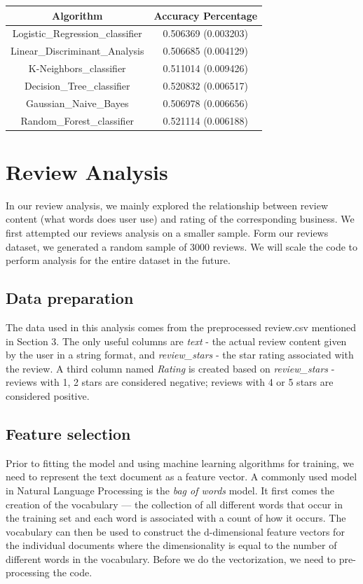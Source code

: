 \documentclass{article}
\begin{document}
\begin{table}[!ht]
\begin{center}
\begin{tabular}{ |c|c| } 
 \hline
Algorithm & Accuracy Percentage \\ 
  \hline
Logistic\_Regression\_classifier & 0.506369 (0.003203) \\ 
  \hline
Linear\_Discriminant\_Analysis & 0.506685 (0.004129) \\
  \hline
K-Neighbors\_classifier & 0.511014 (0.009426) \\
  \hline
Decision\_Tree\_classifier & 0.520832 (0.006517) \\
  \hline
Gaussian\_Naive\_Bayes & 0.506978 (0.006656) \\
  \hline
Random\_Forest\_classifier & 0.521114 (0.006188) \\
\hline
\end{tabular}
\end{center}
\end{table}

\section{Review Analysis}
In our review analysis, we mainly explored the relationship between review content (what words does user use) and rating of the corresponding business. We first attempted our reviews analysis on a smaller sample. Form our reviews dataset, we generated a random sample of 3000 reviews. We will scale the code to perform analysis for the entire dataset in the future. 

\subsection{Data preparation}
The data used in this analysis comes from the preprocessed review.csv mentioned in Section 3. The only useful columns are \textit{text} - the actual review content given by the user in a string format, and  \textit{review\_stars} - the star rating associated with the review. A third column named \textit{Rating} is created based on \textit{review\_stars} - reviews with 1, 2 stars are considered negative; reviews with 4 or 5 stars are considered positive.

\subsection{Feature selection} 
Prior to fitting the model and using machine learning algorithms for training, we need to represent the text document as a feature vector. A commonly used model in Natural Language Processing is the \textit{bag of words} model. It first comes the creation of the vocabulary — the collection of all different words that occur in the training set and each word is associated with a count of how it occurs. The vocabulary can then be used to construct the d-dimensional feature vectors for the individual documents where the dimensionality is equal to the number of different words in the vocabulary. Before we do the vectorization, we need to pre-processing the code.  
\end{document}

